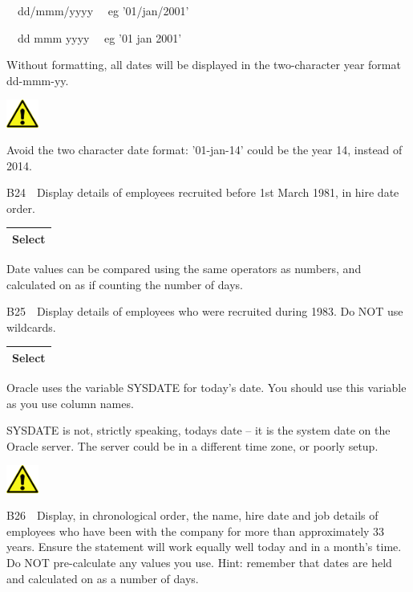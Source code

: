\ \ dd/mmm/yyyy \ \ eg  {}'01/jan/2001' \ \ 

\ \ dd mmm yyyy \ \ eg  {}'01 jan 2001'

Without formatting, all dates will be displayed in the two-character year format dd-mmm-yy.



\begin{center}
  
\includegraphics[width=1.06cm,height=0.903cm]{images/img (2).png}

\end{center}
Avoid the two character date format: '01-jan-14' could be the year 14, instead of  2014.

B24\ \ Display details of employees recruited before 1st March 1981, in hire date order.  

\begin{flushleft}
\tablefirsthead{}
\tablehead{}
\tabletail{}
\tablelasttail{}
\begin{supertabular}{|m{14.303cm}|}
\hline
Select 

\\\hline
\end{supertabular}
\end{flushleft}
Date values can be compared using the same operators as numbers, and calculated on as if counting the number of days.

B25\ \ Display details of employees who were recruited during 1983.  Do NOT use wildcards.

\begin{flushleft}
\tablefirsthead{}
\tablehead{}
\tabletail{}
\tablelasttail{}
\begin{supertabular}{|m{14.303cm}|}
\hline
Select 

\\\hline
\end{supertabular}
\end{flushleft}
Oracle uses the variable SYSDATE for today's date. You should use this variable as you use column names.

SYSDATE is not, strictly speaking, todays date -- it is the system date on the Oracle server. The server could be in a different time zone, or poorly setup.

\begin{center}
  
\includegraphics[width=1.06cm,height=0.903cm]{images/img (2).png}

\end{center}
B26\ \ Display, in chronological order, the name, hire date and job details of employees who have been with the company for more than approximately 33 years.  Ensure the statement will work equally well today and in a month's time.  Do NOT pre-calculate any values you use. Hint: remember that dates are held and calculated on as a number of days.

